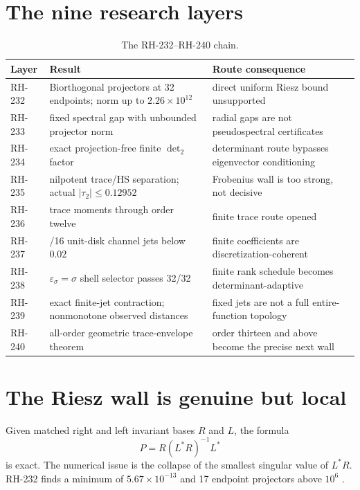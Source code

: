 \documentclass[11pt]{article}
\theoremstyle{remark}
\begin{document}
\section{The nine research layers}

\begin{table}[ht]
\centering
\small
\begin{tabular}{>{\raggedright\arraybackslash}p{}
                >{\raggedright\arraybackslash}p{}
                >{\raggedright\arraybackslash}p{}}
\toprule
Layer & Result & Route consequence\\
\midrule
RH-232 & Biorthogonal projectors at 32 endpoints; norm up to
$2.26\times10^{12}$ & direct uniform Riesz bound unsupported\\
RH-233 & fixed spectral gap with unbounded projector norm & radial gaps are
not pseudospectral certificates\\
RH-234 & exact projection-free finite $\det_2$ factor & determinant route
bypasses eigenvector conditioning\\
RH-235 & nilpotent trace/HS separation; actual $|\tau_2|\le0.12952$ &
Frobenius wall is too strong, not decisive\\
RH-236 & 384 trace moments through order twelve & finite trace route opened\\
RH-237 & 16/16 unit-disk channel jets below $0.02$ & finite coefficients are
discretization-coherent\\
RH-238 & $\varepsilon_\sigma=\sigma$ shell selector passes 32/32 & finite
rank schedule becomes determinant-adaptive\\
RH-239 & exact finite-jet contraction; nonmonotone observed distances & fixed
jets are not a full entire-function topology\\
RH-240 & all-order geometric trace-envelope theorem & order thirteen and
above become the precise next wall\\
\bottomrule
\end{tabular}
\caption{The RH-232--RH-240 chain.}
\end{table}

\section{The Riesz wall is genuine but local}

Given matched right and left invariant bases $R$ and $L$, the formula
\[
 P=R(L^*R)^{-1}L^*
\]
is exact.  The numerical issue is the collapse of the smallest singular value
of $L^*R$.  RH-232 finds a minimum of $5.67\times10^{-13}$ and 17 endpoint
projectors above $10^6$ \citep{WangRH232}.
\end{document}
